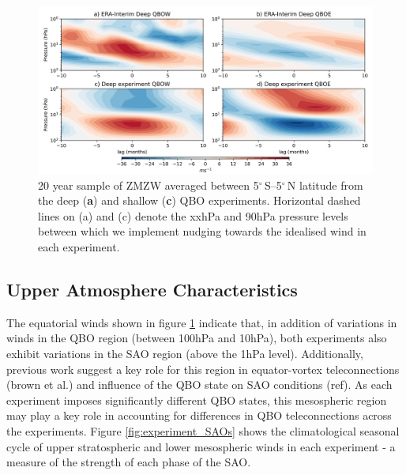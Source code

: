 \begin{figure}[h!]
\begin{center}
\noindent\includegraphics[width = \linewidth]{Figures/Figures-deepQBO/deep_composites_ERA_deepexp.png}
\caption[Equatorial ZMZW time-height profiles from QBO nudging experiments]{20 year sample of ZMZW averaged between 5$^{\circ}$\,S--5$^{\circ}$\,N latitude from the deep (\textbf{a}) and shallow (\textbf{c}) QBO experiments. Horizontal dashed lines on (a) and (c) denote the xxhPa and 90hPa pressure levels between which we implement nudging towards the idealised wind in each experiment.}
\label{fig:experiment_QBOs}
\end{center}
\end{figure}


\subsection{Upper Atmosphere Characteristics}

The equatorial winds shown in figure \ref{fig:experiment_QBOs} indicate that, in addition of variations in winds in the QBO region (between 100hPa and 10hPa), both experiments also exhibit variations in the SAO region (above the 1hPa level). Additionally, previous work suggest a key role for this region in equator-vortex teleconnections (brown et al.) and influence of the QBO state on SAO conditions (ref). As each experiment imposes significantly different QBO states, this mesospheric region may play a key role in accounting for differences in QBO teleconnections across the experiments. Figure \ref{fig:experiment_SAOs} shows the climatological seasonal cycle of upper stratospheric and lower mesospheric winds in each experiment - a measure of the strength of each phase of the SAO. 

